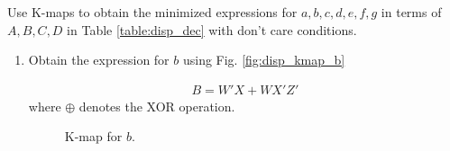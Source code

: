 Use K-maps to obtain the minimized expressions 
for $a,b,c,d,e,f,g$ in terms of $A,B,C,D$ in Table \ref{table:disp_dec} 
with don't care conditions.

\renewcommand{\theequation}{\theenumi}
\renewcommand{\thefigure}{\theenumi}
\begin{enumerate}[label=\thesubsection.\arabic*.,ref=\thesubsection.\theenumi]

\item Obtain the expression for $b$ using Fig. \ref{fig:disp_kmap_b}


\solution

\begin{align}
\label{eq:kmapX_inc_B}
B=W'X+WX'Z'
\end{align}
%
where $\oplus$ denotes the XOR operation.
\begin{figure}[!ht]
\centering
\resizebox{\columnwidth}{!} {

}
\caption{K-map for $b$.}
\label{fig:inc_kmapX_B}
\end{figure}
\end{enumerate}
%
%
